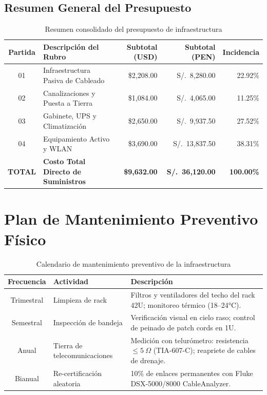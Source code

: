 \subsection{Resumen General del Presupuesto}

\begin{table}[H]
\centering
\caption{Resumen consolidado del presupuesto de infraestructura}
\small
\begin{tabularx}{\textwidth}{@{} c X r r r @{}}
\toprule
\textbf{Partida} & \textbf{Descripción del Rubro} & \textbf{Subtotal (USD)} & \textbf{Subtotal (PEN)} & \textbf{Incidencia} \\
\midrule
01 & Infraestructura Pasiva de Cableado   & \$2,208.00 & S/.~8,280.00  & 22.92\% \\
02 & Canalizaciones y Puesta a Tierra     & \$1,084.00 & S/.~4,065.00  & 11.25\% \\
03 & Gabinete, UPS y Climatización        & \$2,650.00 & S/.~9,937.50  & 27.52\% \\
04 & Equipamiento Activo y WLAN           & \$3,690.00 & S/.~13,837.50 & 38.31\% \\
\midrule
\textbf{TOTAL} & \textbf{Costo Total Directo de Suministros} & \textbf{\$9,632.00} & \textbf{S/.~36,120.00} & \textbf{100.00\%} \\
\bottomrule
\end{tabularx}
\label{tab:presupuesto-total}
\end{table}

\section{Plan de Mantenimiento Preventivo Físico}

\begin{table}[H]
\centering
\caption{Calendario de mantenimiento preventivo de la infraestructura}
\small
\begin{tabularx}{\textwidth}{@{}clX@{}}
\toprule
\textbf{Frecuencia} & \textbf{Actividad} & \textbf{Descripción} \\
\midrule
Trimestral  & Limpieza de rack          & Filtros y ventiladores del techo del rack 42U; monitoreo térmico (18--24°C). \\
Semestral   & Inspección de bandeja     & Verificación visual en cielo raso; control de peinado de patch cords en 1U. \\
Anual       & Tierra de telecomunicaciones & Medición con telurómetro: resistencia $\leq 5~\Omega$ (TIA-607-C); reapriete de cables de drenaje. \\
Bianual     & Re-certificación aleatoria & 10\% de enlaces permanentes con Fluke DSX-5000/8000 CableAnalyzer. \\
\bottomrule
\end{tabularx}
\label{tab:mantenimiento}
\end{table}
